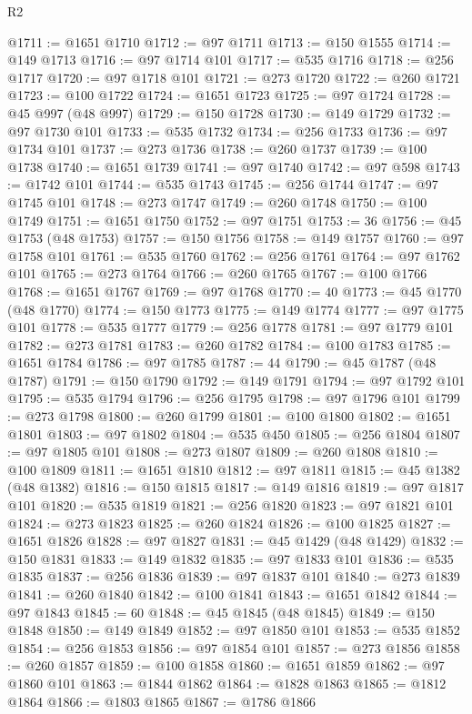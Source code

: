 \begin{lexlean}{R2}
\begin{coremodule}
@1711 := @1651 @1710
@1712 := @97 @1711
@1713 := @150 @1555
@1714 := @149 @1713
@1716 := @97 @1714 @101
@1717 := @535 @1716
@1718 := @256 @1717
@1720 := @97 @1718 @101
@1721 := @273 @1720
@1722 := @260 @1721
@1723 := @100 @1722
@1724 := @1651 @1723
@1725 := @97 @1724
@1728 := @45 @997 (@48 @997)
@1729 := @150 @1728
@1730 := @149 @1729
@1732 := @97 @1730 @101
@1733 := @535 @1732
@1734 := @256 @1733
@1736 := @97 @1734 @101
@1737 := @273 @1736
@1738 := @260 @1737
@1739 := @100 @1738
@1740 := @1651 @1739
@1741 := @97 @1740
@1742 := @97 @598
@1743 := @1742 @101
@1744 := @535 @1743
@1745 := @256 @1744
@1747 := @97 @1745 @101
@1748 := @273 @1747
@1749 := @260 @1748
@1750 := @100 @1749
@1751 := @1651 @1750
@1752 := @97 @1751
@1753 := 36
@1756 := @45 @1753 (@48 @1753)
@1757 := @150 @1756
@1758 := @149 @1757
@1760 := @97 @1758 @101
@1761 := @535 @1760
@1762 := @256 @1761
@1764 := @97 @1762 @101
@1765 := @273 @1764
@1766 := @260 @1765
@1767 := @100 @1766
@1768 := @1651 @1767
@1769 := @97 @1768
@1770 := 40
@1773 := @45 @1770 (@48 @1770)
@1774 := @150 @1773
@1775 := @149 @1774
@1777 := @97 @1775 @101
@1778 := @535 @1777
@1779 := @256 @1778
@1781 := @97 @1779 @101
@1782 := @273 @1781
@1783 := @260 @1782
@1784 := @100 @1783
@1785 := @1651 @1784
@1786 := @97 @1785
@1787 := 44
@1790 := @45 @1787 (@48 @1787)
@1791 := @150 @1790
@1792 := @149 @1791
@1794 := @97 @1792 @101
@1795 := @535 @1794
@1796 := @256 @1795
@1798 := @97 @1796 @101
@1799 := @273 @1798
@1800 := @260 @1799
@1801 := @100 @1800
@1802 := @1651 @1801
@1803 := @97 @1802
@1804 := @535 @450
@1805 := @256 @1804
@1807 := @97 @1805 @101
@1808 := @273 @1807
@1809 := @260 @1808
@1810 := @100 @1809
@1811 := @1651 @1810
@1812 := @97 @1811
@1815 := @45 @1382 (@48 @1382)
@1816 := @150 @1815
@1817 := @149 @1816
@1819 := @97 @1817 @101
@1820 := @535 @1819
@1821 := @256 @1820
@1823 := @97 @1821 @101
@1824 := @273 @1823
@1825 := @260 @1824
@1826 := @100 @1825
@1827 := @1651 @1826
@1828 := @97 @1827
@1831 := @45 @1429 (@48 @1429)
@1832 := @150 @1831
@1833 := @149 @1832
@1835 := @97 @1833 @101
@1836 := @535 @1835
@1837 := @256 @1836
@1839 := @97 @1837 @101
@1840 := @273 @1839
@1841 := @260 @1840
@1842 := @100 @1841
@1843 := @1651 @1842
@1844 := @97 @1843
@1845 := 60
@1848 := @45 @1845 (@48 @1845)
@1849 := @150 @1848
@1850 := @149 @1849
@1852 := @97 @1850 @101
@1853 := @535 @1852
@1854 := @256 @1853
@1856 := @97 @1854 @101
@1857 := @273 @1856
@1858 := @260 @1857
@1859 := @100 @1858
@1860 := @1651 @1859
@1862 := @97 @1860 @101
@1863 := @1844 @1862
@1864 := @1828 @1863
@1865 := @1812 @1864
@1866 := @1803 @1865
@1867 := @1786 @1866

\end{coremodule}
\end{lexlean}
